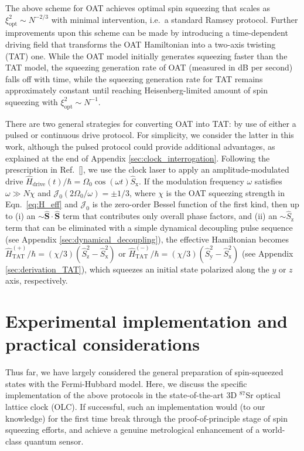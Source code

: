 \documentclass[aps,prx,superscriptaddress,notitlepage,twocolumn,longbibliography]{revtex4-2}
\renewcommand{\t}{\text} %
\newcommand{\p}[1]{\left(#1\right)} %
\renewcommand{\c}{\cdot} %
\renewcommand{\v}{\bm} %
\newcommand{\J}{\mathcal{J}}
\newcommand{\z}{\text{z}}
\newcommand{\x}{\text{x}}
\newcommand{\y}{\text{y}}
\begin{document}
The above scheme for OAT achieves optimal spin squeezing that scales as $\xi^2_{\t{opt}}\sim N^{-2/3}$ with minimal intervention, i.e.~a standard Ramsey protocol.
Further improvements upon this scheme can be made by introducing a time-dependent driving field that transforms the OAT Hamiltonian into a two-axis twisting (TAT) one.
While the OAT model initially generates squeezing faster than the TAT model, the squeezing generation rate of OAT (measured in dB per second) falls off with time, while the squeezing generation rate for TAT remains approximately constant until reaching Heisenberg-limited amount of spin squeezing with $\xi^2_{\t{opt}}\sim N^{-1}$\cite{kitagawa1993squeezed}.

There are two general strategies for converting OAT into TAT: by use of either a pulsed\cite{liu2011spin} or continuous\cite{huang2015twoaxis} drive protocol.
For simplicity, we consider the latter in this  work, although the pulsed protocol could provide additional advantages, as explained at the end of Appendix \ref{sec:clock_interrogation}.
Following the prescription in Ref.~[], we use the clock laser to apply an amplitude-modulated drive $\hat H_{\t{drive}}(t)/\hbar=\Omega_0\cos(\omega t)\hat{S}_\x$.
If the modulation frequency $\omega$ satisfies $\omega\gg N\chi$ and $\J_0\p{2\Omega_0/\omega}=\pm1/3$, where $\chi$ is the OAT squeezing strength in Eqn.~\eqref{eq:H_eff} and $\J_0$ is the zero-order Bessel function of the first kind, then up to (i) an $\sim\hat{\v S}\c\hat{\v S}$ term that contributes only overall phase factors, and (ii) an $\sim\hat S_\z$ term that can be eliminated with a simple dynamical decoupling pulse sequence (see Appendix \ref{sec:dynamical_decoupling}), the effective Hamiltonian becomes $\hat H_{\t{TAT}}^{(+)}/\hbar = (\chi/3)(\hat S_\z^2-\hat S_\x^2)$ or $\hat H_{\t{TAT}}^{(-)}/\hbar = (\chi/3)(\hat S_\y^2-\hat S_\x^2)$ (see Appendix \ref{sec:derivation_TAT}), which squeezes an initial state polarized along the $y$ or $z$ axis, respectively.

\section{Experimental implementation and practical considerations}

Thus far, we have largely considered the general preparation of spin-squeezed states with the Fermi-Hubbard model.
Here, we discuss the specific implementation of the above protocols in the state-of-the-art 3D $^{87}$Sr optical lattice clock (OLC).
If successful, such an implementation would (to our knowledge) for the first time break through the proof-of-principle stage of spin squeezing efforts, and achieve a genuine metrological enhancement of a world-class quantum sensor.
\end{document}
